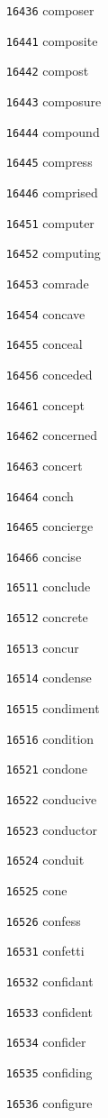 \documentclass[twoside,11pt]{article}
\begin{document}
\begin{multicols}{5}
\begin{enumerate}
\item[\texttt{16436}] composer
\item[\texttt{16441}] composite
\item[\texttt{16442}] compost
\item[\texttt{16443}] composure
\item[\texttt{16444}] compound
\item[\texttt{16445}] compress
\item[\texttt{16446}] comprised
\item[\texttt{16451}] computer
\item[\texttt{16452}] computing
\item[\texttt{16453}] comrade
\item[\texttt{16454}] concave
\item[\texttt{16455}] conceal
\item[\texttt{16456}] conceded
\item[\texttt{16461}] concept
\item[\texttt{16462}] concerned
\item[\texttt{16463}] concert
\item[\texttt{16464}] conch
\item[\texttt{16465}] concierge
\item[\texttt{16466}] concise
\item[\texttt{16511}] conclude
\item[\texttt{16512}] concrete
\item[\texttt{16513}] concur
\item[\texttt{16514}] condense
\item[\texttt{16515}] condiment
\item[\texttt{16516}] condition
\item[\texttt{16521}] condone
\item[\texttt{16522}] conducive
\item[\texttt{16523}] conductor
\item[\texttt{16524}] conduit
\item[\texttt{16525}] cone
\item[\texttt{16526}] confess
\item[\texttt{16531}] confetti
\item[\texttt{16532}] confidant
\item[\texttt{16533}] confident
\item[\texttt{16534}] confider
\item[\texttt{16535}] confiding
\item[\texttt{16536}] configure

\end{enumerate}
\end{multicols}
\end{document}
